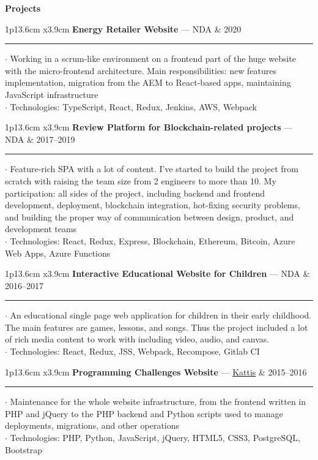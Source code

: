 \documentclass[10pt,A4]{article}
\newcommand{\cvsection}[1]
{
	\begin{center}
		\large\textcolor{sectcol}{\textbf{#1}}
	\end{center}
}
\newcommand{\cvevent}[5]
{
  \begin{tabular*}{1\textwidth}{p{13.6cm}  x{3.9cm}}
  	\textbf{#2} — \textcolor{bgcol}{#3} &   \vspace{2.5pt}\textcolor{sectcol}{#1}
  \end{tabular*}

  \vspace{-8pt}
    \textcolor{softcol}{\hrule}
  \vspace{6pt}

  $\cdot$ #4\\[3pt]
  $\cdot$ #5\\[6pt]
}
\newcommand{\mystrut}{\rule[-.3\baselineskip]{0pt}{\baselineskip}}
\begin{document}
\vspace{-18pt}
\cvsection{Projects}
\vspace{-6pt}

%
\cvevent{2020}
{Energy Retailer Website}
{NDA}
{Working in a scrum-like environment on a frontend part of the huge website with the micro-frontend architecture.
  Main responsibilities: new features implementation, migration from the AEM to React-based apps, maintaining JavaScript infrastructure}
{Technologies: TypeScript, React, Redux, Jenkins, AWS, Webpack}


%
\cvevent{2017–2019}
{Review Platform for Blockchain-related projects}
{NDA}
{Feature-rich SPA with a lot of content.
  I've started to build the project from scratch with raising the team size from 2 engineers to more than 10.
  My participation: all sides of the project, including backend and frontend development,
  deployment, blockchain integration, hot-fixing security problems, and building the proper way of communication
  between design, product, and development teams}
{Technologies: React, Redux, Express, Blockchain, Ethereum, Bitcoin, Azure Web Apps, Azure Functions}


%
\cvevent{2016–2017}
{Interactive Educational Website for Children}
{NDA}
{An educational single page web application for children in their early childhood.
  The main features are games, lessons, and songs.
  Thus the project included a lot of rich media content to work with including video, audio, and canvas.}
{Technologies: React, Redux, JSS, Webpack, Recompose, Gitlab CI}


%
\cvevent{2015–2016}
{Programming Challenges Website}
{\href{https://open.kattis.com/}{Kattis}}
{Maintenance for the whole website infrastructure, from the frontend written in PHP and jQuery
  to the PHP backend and Python scripts used to manage deployments, migrations, and other operations}
{Technologies: PHP, Python, JavaScript, jQuery, HTML5, CSS3, PostgreSQL, Bootstrap}


\null
\vspace*{\fill}
\hspace{-0.25\linewidth}\colorbox{white}{\makebox[1.5\linewidth][c]{\mystrut  \textnormal{\textcolor{sectcol}{\href{https://github.com/102}{github.com/102}}}}}




%
%
%
%
%
%
\end{document}
